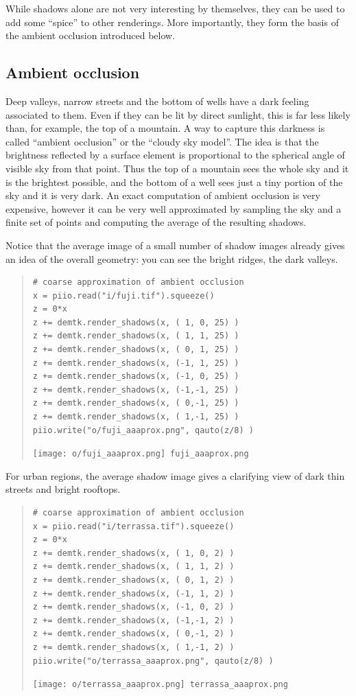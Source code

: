 While shadows alone are not very interesting by themselves, they can be used
to add some ``spice'' to other renderings.  More importantly, they form the
basis of the ambient occlusion introduced below.


\clearpage
\subsection{Ambient occlusion}

Deep valleys, narrow streets and the bottom of wells have a dark feeling
associated to them.  Even if they can be lit by direct sunlight, this is far
less likely than, for example, the top of a mountain.  A way to capture this
darkness is called ``ambient occlusion'' or the ``cloudy sky model''.  The
idea is that the brightness reflected by a surface element is proportional to
the spherical angle of visible sky from that point.  Thus the top of a
mountain sees the whole sky and it is the brightest possible, and the bottom
of a well sees just a tiny portion of the sky and it is very dark.  An exact
computation of ambient occlusion is very expensive, however it can be
very well approximated by sampling the sky and a finite set of points and
computing the average of the resulting shadows.


Notice that the average image of a small number of shadow images already
gives an idea of the overall geometry: you can see the bright ridges, the
dark valleys.
\begin{quote}
 \begin{verbatim}
# coarse approximation of ambient occlusion
x = piio.read("i/fuji.tif").squeeze()
z = 0*x
z += demtk.render_shadows(x, ( 1, 0, 25) )
z += demtk.render_shadows(x, ( 1, 1, 25) )
z += demtk.render_shadows(x, ( 0, 1, 25) )
z += demtk.render_shadows(x, (-1, 1, 25) )
z += demtk.render_shadows(x, (-1, 0, 25) )
z += demtk.render_shadows(x, (-1,-1, 25) )
z += demtk.render_shadows(x, ( 0,-1, 25) )
z += demtk.render_shadows(x, ( 1,-1, 25) )
piio.write("o/fuji_aaaprox.png", qauto(z/8) )
\end{verbatim}
\texttt{[image: o/fuji\_aaaprox.png]}~\verb+fuji_aaaprox.png+
\end{quote}

For urban regions, the average shadow image gives a clarifying view of dark
thin streets and bright rooftops.
\begin{quote}
 \begin{verbatim}
# coarse approximation of ambient occlusion
x = piio.read("i/terrassa.tif").squeeze()
z = 0*x
z += demtk.render_shadows(x, ( 1, 0, 2) )
z += demtk.render_shadows(x, ( 1, 1, 2) )
z += demtk.render_shadows(x, ( 0, 1, 2) )
z += demtk.render_shadows(x, (-1, 1, 2) )
z += demtk.render_shadows(x, (-1, 0, 2) )
z += demtk.render_shadows(x, (-1,-1, 2) )
z += demtk.render_shadows(x, ( 0,-1, 2) )
z += demtk.render_shadows(x, ( 1,-1, 2) )
piio.write("o/terrassa_aaaprox.png", qauto(z/8) )
\end{verbatim}
\texttt{[image: o/terrassa\_aaaprox.png]}~\verb+terrassa_aaaprox.png+
\end{quote}

